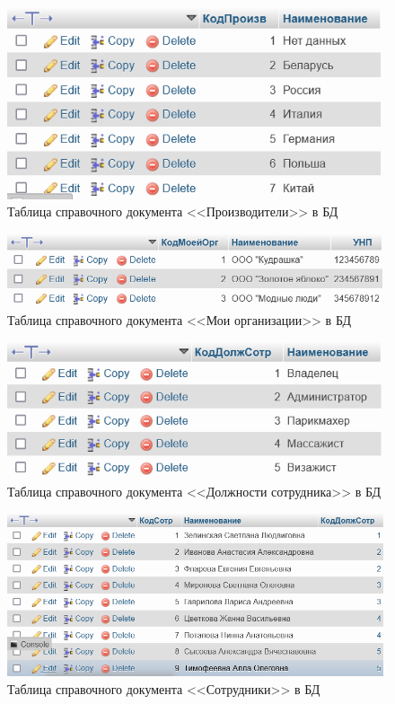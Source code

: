 \documentclass[12pt, a4paper, simple]{eskdtext}
\begin{document}
    \begin{figure}[!h]
        \centering
        \includegraphics[width=12cm]
            {_assets/СП_Произв.png}
        \caption{Таблица справочного документа <<Производители>> в БД}
        \label{fig:CP_Proizv}
    \end{figure}

    \begin{figure}[!h]
        \centering
        \includegraphics[width=12cm]
            {_assets/СП_МоиОрг.png}
        \caption{Таблица справочного документа <<Мои организации>> в БД}
        \label{fig:CP_MoiOrg}
    \end{figure}

    \begin{figure}[!h]
        \centering
        \includegraphics[width=12cm]
            {_assets/СП_ДолжСотр.png}
        \caption{Таблица справочного документа <<Должности сотрудника>> в БД}
        \label{fig:CP_DoljSotr}
    \end{figure}

    \begin{figure}[!h]
        \centering
        \includegraphics[width=12cm]
            {_assets/СП_Сотр.png}
        \caption{Таблица справочного документа <<Сотрудники>> в БД}
        \label{fig:CP_Sotr}
    \end{figure}
\end{document}
